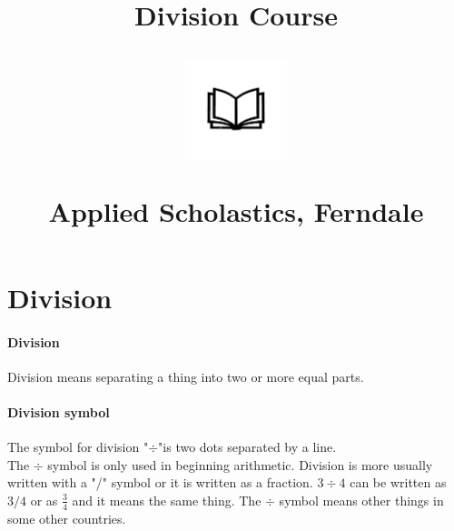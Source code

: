 \documentclass[12pt]{article}
\title{Division Course\\
\begin{center}
\includegraphics[width=4em]{ApS_logo.png}
\end{center}
\begin{normalsize}Applied Scholastics, Ferndale \end{normalsize}}
\author{}
\date{}
\begin{document}
\maketitle

\section*{Division}

\paragraph{Division}
Division means separating a thing into two or more equal parts.\\

\paragraph{Division symbol \div}
The symbol for division "$\div$"is two dots separated by a line.\\

The $\div$ symbol is only used in beginning arithmetic. Division is more usually written with a "/" symbol or it is written as a fraction. $3 \div 4$ can be written as $3/4$ or as $\frac{3}{4}$ and it means the same thing. The $\div$ symbol means other things in some other countries.\\
\end{document}
